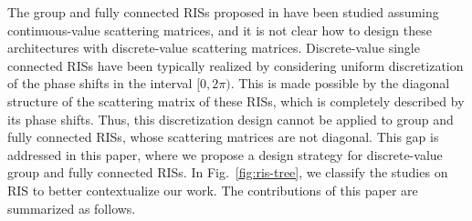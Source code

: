 \documentclass[twocolumn,10pt]{IEEEtran}
\begin{document}
The group and fully connected RISs proposed in \cite{she20} have been studied assuming continuous-value scattering matrices, and it is not clear how to design these architectures with discrete-value scattering matrices.
Discrete-value single connected RISs have been typically realized by considering uniform discretization of the phase shifts in the interval $[0,2\pi)$.
This is made possible by the diagonal structure of the scattering matrix of these RISs, which is completely described by its phase shifts.
Thus, this discretization design cannot be applied to group and fully connected RISs, whose scattering matrices are not diagonal.
This gap is addressed in this paper, where we propose a design strategy for discrete-value group and fully connected RISs.
In Fig.~\ref{fig:ris-tree}, we classify the studies on RIS to better contextualize our work.
The contributions of this paper are summarized as follows.
\end{document}
